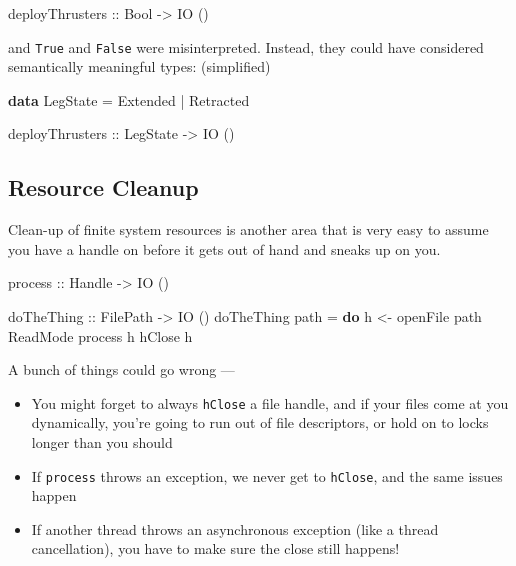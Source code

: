 \documentclass[]{article}
\newenvironment{Shaded}{}{}
\newcommand{\DataTypeTok}[1]{\textcolor[rgb]{0.56,0.13,0.00}{#1}}
\newcommand{\KeywordTok}[1]{\textcolor[rgb]{0.00,0.44,0.13}{\textbf{#1}}}
\newcommand{\NormalTok}[1]{#1}
\newcommand{\OperatorTok}[1]{\textcolor[rgb]{0.40,0.40,0.40}{#1}}
\newcommand{\OtherTok}[1]{\textcolor[rgb]{0.00,0.44,0.13}{#1}}
\begin{document}
\begin{Shaded}
\begin{Highlighting}[]
\OtherTok{deployThrusters ::} \DataTypeTok{Bool} \OtherTok{{-}\textgreater{}} \DataTypeTok{IO}\NormalTok{ ()}
\end{Highlighting}
\end{Shaded}

and \texttt{True} and \texttt{False} were misinterpreted. Instead, they could
have considered semantically meaningful types: (simplified)

\begin{Shaded}
\begin{Highlighting}[]
\KeywordTok{data} \DataTypeTok{LegState} \OtherTok{=} \DataTypeTok{Extended} \OperatorTok{|} \DataTypeTok{Retracted}

\OtherTok{deployThrusters ::} \DataTypeTok{LegState} \OtherTok{{-}\textgreater{}} \DataTypeTok{IO}\NormalTok{ ()}
\end{Highlighting}
\end{Shaded}

\subsection{Resource Cleanup}\label{resource-cleanup}

Clean-up of finite system resources is another area that is very easy to assume
you have a handle on before it gets out of hand and sneaks up on you.

\begin{Shaded}
\begin{Highlighting}[]
\OtherTok{process ::} \DataTypeTok{Handle} \OtherTok{{-}\textgreater{}} \DataTypeTok{IO}\NormalTok{ ()}

\OtherTok{doTheThing ::} \DataTypeTok{FilePath} \OtherTok{{-}\textgreater{}} \DataTypeTok{IO}\NormalTok{ ()}
\NormalTok{doTheThing path }\OtherTok{=} \KeywordTok{do}
\NormalTok{  h }\OtherTok{\textless{}{-}}\NormalTok{ openFile path }\DataTypeTok{ReadMode}
\NormalTok{  process h}
\NormalTok{  hClose h}
\end{Highlighting}
\end{Shaded}

A bunch of things could go wrong ---

\begin{itemize}
\tightlist
\item
  You might forget to always \texttt{hClose} a file handle, and if your files
  come at you dynamically, you're going to run out of file descriptors, or hold
  on to locks longer than you should
\item
  If \texttt{process} throws an exception, we never get to \texttt{hClose}, and
  the same issues happen
\item
  If another thread throws an asynchronous exception (like a thread
  cancellation), you have to make sure the close still happens!
\end{itemize}
\end{document}
